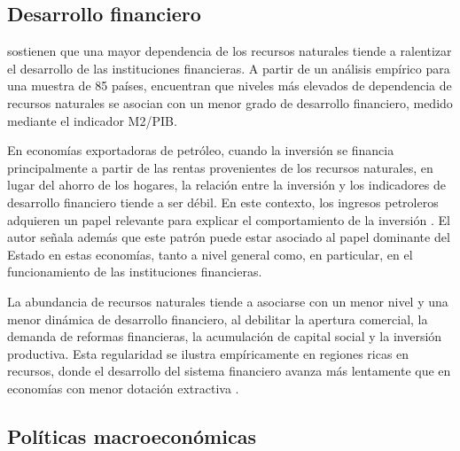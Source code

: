 \documentclass[../../PTFM.tex]{subfiles}
\begin{document}
	\subsection{Desarrollo financiero}
	\label{subsec:desarrollo-financiero}
	
	\textcite{Gylfason2006} sostienen que una mayor dependencia de los recursos naturales tiende a ralentizar el desarrollo de las instituciones financieras. A partir de un análisis empírico para una muestra de 85 países, encuentran que niveles más elevados de dependencia de recursos naturales se asocian con un menor grado de desarrollo financiero, medido mediante el indicador M2/PIB.
	
	En economías exportadoras de petróleo, cuando la inversión se financia principalmente a partir de las rentas provenientes de los recursos naturales, en lugar del ahorro de los hogares, la relación entre la inversión y los indicadores de desarrollo financiero tiende a ser débil. En este contexto, los ingresos petroleros adquieren un papel relevante para explicar el comportamiento de la inversión \parencite{Nili2007}. El autor señala además que este patrón puede estar asociado al papel dominante del Estado en estas economías, tanto a nivel general como, en particular, en el funcionamiento de las instituciones financieras.
	
	La abundancia de recursos naturales tiende a asociarse con un menor nivel y una menor dinámica de desarrollo financiero, al debilitar la apertura comercial, la demanda de reformas financieras, la acumulación de capital social y la inversión productiva. Esta regularidad se ilustra empíricamente en regiones ricas en recursos, donde el desarrollo del sistema financiero avanza más lentamente que en economías con menor dotación extractiva \parencite{Yuxiang2011}.
	
	\subsection{Políticas macroeconómicas}	
	\label{subsec:politicas-macroeconomicas}
	
\end{document}
